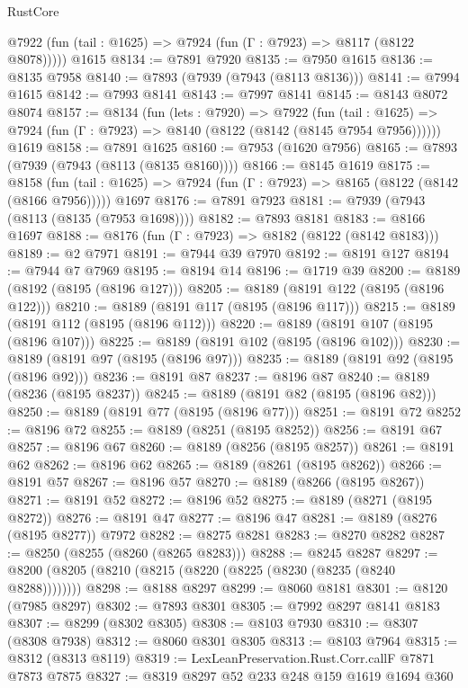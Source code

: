 \begin{lexlean}{RustCore}
\begin{coremodule}
      @7922 (fun (tail : @1625) => @7924 (fun (Γ : @7923) => @8117 (@8122 @8078)))))
    @1615
@8134 := @7891 @7920
@8135 := @7950 @1615
@8136 := @8135 @7958
@8140 := @7893 (@7939 (@7943 (@8113 @8136)))
@8141 := @7994 @1615
@8142 := @7993 @8141
@8143 := @7997 @8141
@8145 := @8143 @8072 @8074
@8157 := @8134
    (fun (lets : @7920) =>
    @7922
      (fun (tail : @1625) => @7924 (fun (Γ : @7923) => @8140 (@8122 (@8142 (@8145 @7954 @7956))))))
    @1619
@8158 := @7891 @1625
@8160 := @7953 (@1620 @7956)
@8165 := @7893 (@7939 (@7943 (@8113 (@8135 @8160))))
@8166 := @8145 @1619
@8175 := @8158
    (fun (tail : @1625) => @7924 (fun (Γ : @7923) => @8165 (@8122 (@8142 (@8166 @7956)))))
    @1697
@8176 := @7891 @7923
@8181 := @7939 (@7943 (@8113 (@8135 (@7953 @1698))))
@8182 := @7893 @8181
@8183 := @8166 @1697
@8188 := @8176 (fun (Γ : @7923) => @8182 (@8122 (@8142 @8183)))
@8189 := @2 @7971
@8191 := @7944 @39 @7970
@8192 := @8191 @127
@8194 := @7944 @7 @7969
@8195 := @8194 @14
@8196 := @1719 @39
@8200 := @8189 (@8192 (@8195 (@8196 @127)))
@8205 := @8189 (@8191 @122 (@8195 (@8196 @122)))
@8210 := @8189 (@8191 @117 (@8195 (@8196 @117)))
@8215 := @8189 (@8191 @112 (@8195 (@8196 @112)))
@8220 := @8189 (@8191 @107 (@8195 (@8196 @107)))
@8225 := @8189 (@8191 @102 (@8195 (@8196 @102)))
@8230 := @8189 (@8191 @97 (@8195 (@8196 @97)))
@8235 := @8189 (@8191 @92 (@8195 (@8196 @92)))
@8236 := @8191 @87
@8237 := @8196 @87
@8240 := @8189 (@8236 (@8195 @8237))
@8245 := @8189 (@8191 @82 (@8195 (@8196 @82)))
@8250 := @8189 (@8191 @77 (@8195 (@8196 @77)))
@8251 := @8191 @72
@8252 := @8196 @72
@8255 := @8189 (@8251 (@8195 @8252))
@8256 := @8191 @67
@8257 := @8196 @67
@8260 := @8189 (@8256 (@8195 @8257))
@8261 := @8191 @62
@8262 := @8196 @62
@8265 := @8189 (@8261 (@8195 @8262))
@8266 := @8191 @57
@8267 := @8196 @57
@8270 := @8189 (@8266 (@8195 @8267))
@8271 := @8191 @52
@8272 := @8196 @52
@8275 := @8189 (@8271 (@8195 @8272))
@8276 := @8191 @47
@8277 := @8196 @47
@8281 := @8189 (@8276 (@8195 @8277)) @7972
@8282 := @8275 @8281
@8283 := @8270 @8282
@8287 := @8250 (@8255 (@8260 (@8265 @8283)))
@8288 := @8245 @8287
@8297 := @8200 (@8205 (@8210 (@8215 (@8220 (@8225 (@8230 (@8235 (@8240 @8288))))))))
@8298 := @8188 @8297
@8299 := @8060 @8181
@8301 := @8120 (@7985 @8297)
@8302 := @7893 @8301
@8305 := @7992 @8297 @8141 @8183
@8307 := @8299 (@8302 @8305)
@8308 := @8103 @7930
@8310 := @8307 (@8308 @7938)
@8312 := @8060 @8301 @8305
@8313 := @8103 @7964
@8315 := @8312 (@8313 @8119)
@8319 := LexLeanPreservation.Rust.Corr.callF @7871 @7873 @7875
@8327 := @8319 @8297 @52 @233 @248 @159 @1619 @1694 @360

\end{coremodule}
\end{lexlean}
